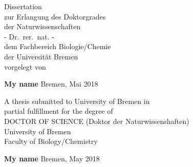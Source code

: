 \documentclass[10 pt, a4paper, twoside, openright]{Thesis}
\begin{document}
\begin{titlepage}

\begin{center}



\vspace*{2cm}

{\huge \textbf{\ttitle}\par}
\thispagestyle{empty}
\vspace{1.5cm}
Dissertation \\
zur Erlangung des Doktorgrades \\
der Naturwissenschaften \\
- Dr.\ rer.\ nat. - \\ %
\vspace{1cm}
dem Fachbereich Biologie/Chemie \\
der Universit\"{a}t Bremen \\
vorgelegt von

\vspace{1.5cm}

\textbf{My name}
\null{}
\vfill
{\large{Bremen, Mai 2018}}\\[4cm] %
\cleardoublepage{}
\vspace*{2cm}

{\huge \textbf{\ttitle}\par}
\thispagestyle{empty}

\vspace{1.5cm}
A thesis submitted to University of Bremen in \\
partial fulfillment for the degree of \\
DOCTOR OF SCIENCE (Doktor der Naturwissenshaften) \\
\vspace{1.5cm}
University of Bremen\\
Faculty of Biology/Chemistry \\
\vspace{1.5cm}

\textbf{My name}
\vspace{2cm}
\vfill
{\large{Bremen, May 2018}}\\[4cm] %





\end{center}
\end{titlepage}
\end{document}
